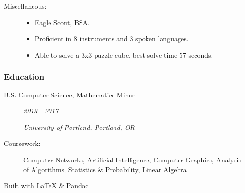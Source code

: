 \documentclass{article}
\begin{document}
\begin{description}
            \vspace{0.5em}

        \item[Miscellaneous:] \hfill
            \begin{itemize}
                \item Eagle Scout, BSA.
                \item Proficient in 8 instruments and 3 spoken languages.
                \item Able to solve a 3x3 puzzle cube, best solve time 57 seconds.
        \end{itemize}
    \end{description}
    
\subsubsection*{Education}
    \begin{description}
        \item[B.S. Computer Science, Mathematics Minor]\hfill \textit{2013 - 2017}

        \textit{University of Portland, Portland, OR}

        \vspace{0.5em}

        \item[Coursework:]
            Computer Networks, 
            Artificial Intelligence, 
            Computer Graphics, 
            Analysis of Algorithms,
            Statistics \& Probability,
            Linear Algebra
    \end{description}
    
    \begin{center}
	\vspace{.25in}
    \href{https://www.github.com/BurnsCommaLucas/Resume}{\tiny Built with \LaTeX \hspace{0.001in} \& Pandoc}
    \end{center}
\end{document}
